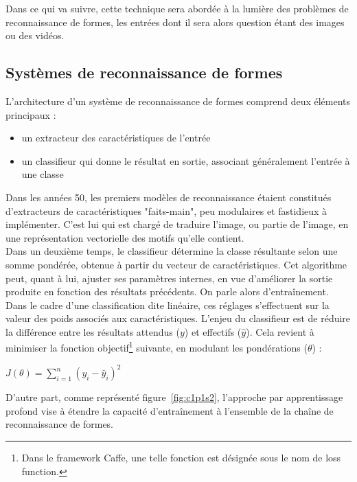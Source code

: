 \documentclass[a4paper,10pt]{report}
\begin{document}
Dans ce qui va suivre, cette technique sera abordée à la lumière des problèmes de reconnaissance de formes, les entrées dont il sera alors question étant des images ou des vidéos.

\subsection{Systèmes de reconnaissance de formes}

L'architecture d'un système de reconnaissance de formes comprend deux éléments principaux :

\begin{itemize}
  \item un extracteur des caractéristiques de l'entrée
  \item un classifieur qui donne le résultat en sortie, associant généralement l'entrée à une classe
\end{itemize}


Dans les années 50, les premiers modèles de reconnaissance étaient constitués d'extracteurs de caractéristiques "faits-main", peu modulaires et fastidieux à implémenter\cite{Bib_LeCun}.
C'est lui qui est chargé de traduire l'image, ou partie de l'image, en une représentation vectorielle des motifs qu'elle contient.
\\

Dans un deuxième temps, le classifieur détermine la classe résultante selon une somme pondérée, obtenue à partir du vecteur de caractéristiques.
Cet algorithme peut, quant à lui, ajuster ses paramètres internes, en vue d'améliorer la sortie produite en fonction des résultats précédents. On parle alors d'entraînement.
Dans le cadre d'une classification dite linéaire, ces réglages s'effectuent sur la valeur des poids associés aux caractéristiques.
L'enjeu du classifieur est de réduire la différence entre les résultats attendus ($y$) et effectifs ($\hat{y}$).
Cela revient à minimiser la fonction objectif\footnote{Dans le framework Caffe, une telle fonction est désignée sous le nom de loss function.} suivante, en modulant les pondérations ($\theta$) :

\begin{center} $ J({\theta}) =  \sum\limits_{i=1}^{n} (y_{i} - \hat{y}_{i})^2 $ \end{center}

D'autre part, comme représenté figure~\ref{fig:c1p1s2}, l'approche par apprentissage profond vise à étendre la capacité d'entraînement à l'ensemble de la chaîne de reconnaissance de formes.
\end{document}
